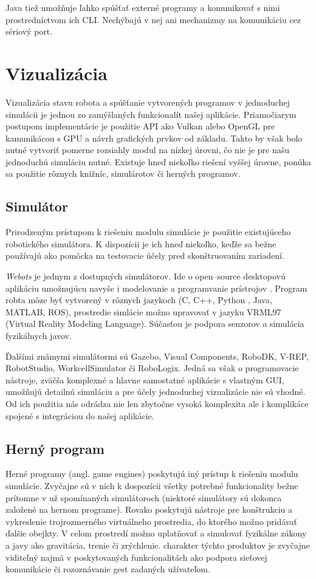 Java tiež umožňuje ľahko spúšťať externé programy a komunikovať s nimi prostredníctvom ich CLI. Nechýbajú v nej ani mechanizmy na komunikáciu cez sériový port.


\section{Vizualizácia}
Vizualizácia stavu robota a spúšťanie vytvorených programov v jednoduchej simulácii je jednou zo zamýšlaných funkcionalít našej aplikácie. Priamočiarym postupom implementácie je použitie API ako Vulkan alebo OpenGL pre kamunikácou s GPU a návrh grafických prvkov od základu. Takto by však bolo nutné vytvoriť pomerne rozsiahly modul na nízkej úrovni, čo nie je pre našu jednoduchú simuláciu nutné. Existuje hneď niekoľko riešení vyššej úrovne, ponúka sa použitie rôznych knižníc, simulárotov či herných programov.

\subsection{Simulátor}
Prirodzeným prístupom k riešeniu modulu simulácie je použitie existujúceho robotického simulátora. K dispozícii je ich hneď niekoľko, keďže sa bežne používajú ako pomôcka na testovacie účely pred skonštruovaním zariadení.

\textit{Webots} je jednym z dostupných simulátorov. Ide o open--source desktopovú aplikáciu umožnujúcu navyše i modelovanie a programvanie prístrojov \cite{Webots}. Program robta môze byť vytvorený v rôznych jazykoch (C, C++, Python , Java, MATLAB, ROS), prostredie simlácie možno upravovať v jazyku VRML97 (Virtual Reality Modeling Language). Súčasťou je podpora senzorov a simulácia fyzikálnych javov.

Ďalšími známymi simulátormi sú Gazebo, Visual Components, RoboDK, V-REP, RobotStudio, WorkcellSimulator či RoboLogix. Jedná sa však o programovacie nástroje, zväčša komplexné a hlavne samostatné aplikácie s vlastným GUI, umožňujú detailnú simuláciu a pre účely jednoduchej vizualizácie nie sú vhodné. Od ich použitia nás odrádza nie len zbytočne vysoká komplexita ale i komplikáce spojené s integráciou do našej aplikácie.

\subsection{Herný program}
Herné programy (angl. game engines) poskytujú iný prístup k riešeniu modulu simulácie. Zvyčajne sú v nich k dospozícii všetky potrebné funkcionality bežne prítomne v už spomínaných simulátoroch (niektoré simulátory sú dokonca založené na hernom programe). Rovako poskytujú nástroje pre konštrukciu a vykreslenie trojrozmerného virtuálneho prostredia, do ktorého možno pridávať ďalšie obejkty. V celom prostredí možno uplatňovať a simulovať fyzikálne zákony a javy ako gravitácia, trenie či zrýchlenie.  charakter týchto produktov je zvyčajne viditeľný najmä v poskytovaných funkcionalitách ako podpora sieťovej komunikácie či rozoznávanie gest zadaných užívateľom.

